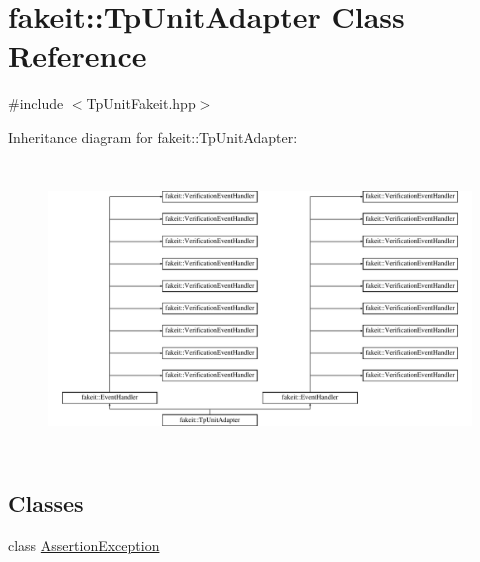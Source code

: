 \hypertarget{classfakeit_1_1TpUnitAdapter}{}\section{fakeit\+::Tp\+Unit\+Adapter Class Reference}
\label{classfakeit_1_1TpUnitAdapter}


{\ttfamily \#include $<$Tp\+Unit\+Fakeit.\+hpp$>$}

Inheritance diagram for fakeit\+::Tp\+Unit\+Adapter\+:\begin{figure}[H]
\begin{center}
\leavevmode
\includegraphics[height=7.777778cm]{classfakeit_1_1TpUnitAdapter}
\end{center}
\end{figure}
\subsection*{Classes}
\begin{DoxyCompactItemize}
\item 
class \mbox{\hyperlink{classfakeit_1_1TpUnitAdapter_1_1AssertionException}{Assertion\+Exception}}
\end{DoxyCompactItemize}
